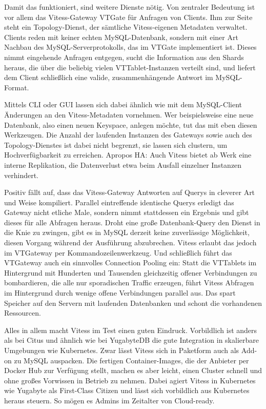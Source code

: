 Damit das funktioniert, sind weitere Dienste nötig. Von zentraler Bedeutung ist vor allem das Vitess-Gateway VTGate für Anfragen von Clients. Ihm zur Seite steht ein Topology-Dienst, der sämtliche Vitess-eigenen Metadaten verwaltet. Clients reden mit keiner echten MySQL-Datenbank, sondern mit einer Art Nachbau des MySQL-Serverprotokolls, das im VTGate implementiert ist. Dieses nimmt eingehende Anfragen entgegen, sucht die Information aus den Shards heraus, die über die beliebig vielen VTTablet-Instanzen verteilt sind, und liefert dem Client schließlich eine valide, zusammenhängende Antwort im MySQL-Format.

Mittels CLI oder GUI lassen sich dabei ähnlich wie mit dem MySQL-Client Änderungen an den Vitess-Metadaten vornehmen. Wer beispielsweise eine neue Datenbank, also einen neuen Keyspace, anlegen möchte, tut das mit eben diesen Werkzeugen. Die Anzahl der laufenden Instanzen des Gateways sowie auch des Topology-Dienstes ist dabei nicht begrenzt, sie lassen sich clustern, um Hochverfügbarkeit zu erreichen. Apropos HA: Auch Vitess bietet ab Werk eine interne Replikation, die Datenverlust etwa beim Ausfall einzelner Instanzen verhindert.

Positiv fällt auf, dass das Vitess-Gateway Antworten auf Querys in cleverer Art und Weise kompiliert. Parallel eintreffende identische Querys erledigt das Gateway nicht etliche Male, sondern nimmt stattdessen ein Ergebnis und gibt dieses für alle Abfragen heraus. Droht eine große Datenbank-Query den Dienst in die Knie zu zwingen, gibt es in MySQL derzeit keine zuverlässige Möglichkeit, diesen Vorgang während der Ausführung abzubrechen. Vitess erlaubt das jedoch im VTGateway per Kommandozeilenwerkzeug. Und schließlich führt das VTGateway auch ein sinnvolles Connection Pooling ein: Statt die VTTablets im Hintergrund mit Hunderten und Tausenden gleichzeitig offener Verbindungen zu bombardieren, die alle nur sporadischen Traffic erzeugen, führt Vitess Abfragen im Hintergrund durch wenige offene Verbindungen parallel aus. Das spart Speicher auf den Servern mit laufenden Datenbanken und schont die vorhandenen Ressourcen.

Alles in allem macht Vitess im Test einen guten Eindruck. Vorbildlich ist anders als bei Citus und ähnlich wie bei YugabyteDB die gute Integration in skalierbare Umgebungen wie Kubernetes. Zwar lässt Vitess sich in Paketform auch als Add-on zu MySQL auspacken. Die fertigen Container-Images, die der Anbieter per Docker Hub zur Verfügung stellt, machen es aber leicht, einen Cluster schnell und ohne großes Vorwissen in Betrieb zu nehmen. Dabei agiert Vitess in Kubernetes wie Yugabyte als First-Class Citizen und lässt sich vorbildlich aus Kubernetes heraus steuern. So mögen es Admins im Zeitalter von Cloud-ready.

